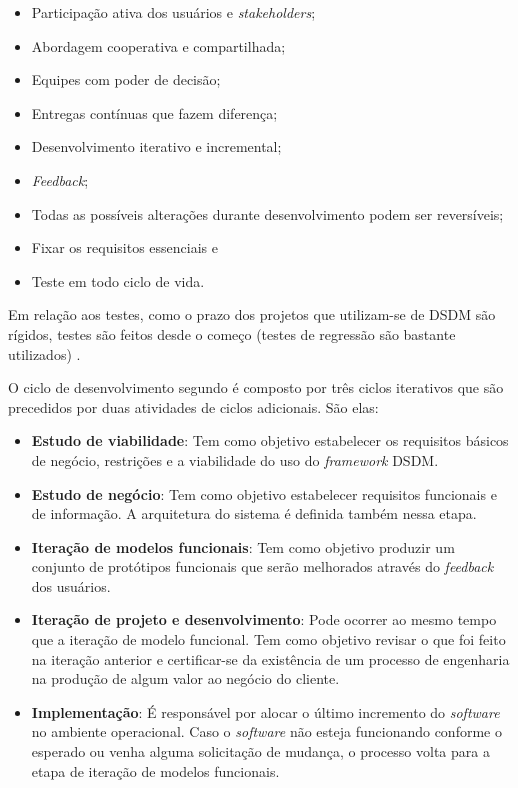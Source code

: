\begin{itemize}
	\item Participação ativa dos usuários e \textit{stakeholders};
	\item Abordagem cooperativa e compartilhada;
	\item Equipes com poder de decisão;
	\item Entregas contínuas que fazem diferença;
	\item Desenvolvimento iterativo e incremental;
	\item \textit{Feedback};
	\item Todas as possíveis alterações durante desenvolvimento podem ser reversíveis;
	\item Fixar os requisitos essenciais e
	\item Teste em todo ciclo de vida.
\end{itemize}

Em relação aos testes, como o prazo dos projetos que utilizam-se de DSDM são rígidos, testes são feitos desde o começo (testes de regressão são bastante utilizados) \cite{macedo:12}. 

O ciclo de desenvolvimento segundo  é composto por três ciclos iterativos que são precedidos por duas atividades de ciclos adicionais. São elas:

\begin{itemize}
	\item \textbf{Estudo de viabilidade}: Tem como objetivo estabelecer os requisitos básicos de negócio, restrições e a viabilidade do uso do \textit{framework} DSDM.
	\item \textbf{Estudo de negócio}: Tem como objetivo estabelecer requisitos funcionais e de informação. A arquitetura do sistema é definida também nessa etapa.
	\item \textbf{Iteração de modelos funcionais}: Tem como objetivo produzir um conjunto de protótipos funcionais que serão melhorados através do \textit{feedback} dos usuários.
	\item \textbf{Iteração de projeto e desenvolvimento}: Pode ocorrer ao mesmo tempo que a iteração de modelo funcional. Tem como objetivo revisar o que foi feito na iteração anterior e certificar-se da existência de um processo de engenharia na produção de algum valor ao negócio do cliente. 
	\item \textbf{Implementação}: É responsável por alocar o último incremento do \textit{software} no ambiente operacional. Caso o \textit{software} não esteja funcionando conforme o esperado ou venha alguma solicitação de mudança, o processo volta para a etapa de iteração de modelos funcionais.
\end{itemize}

